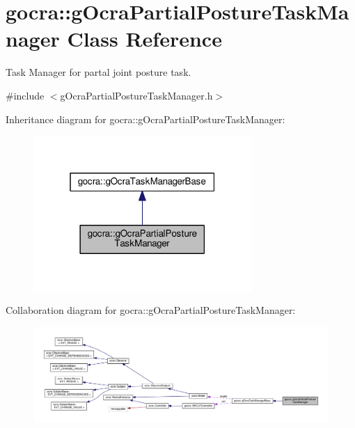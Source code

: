 \hypertarget{classgocra_1_1gOcraPartialPostureTaskManager}{}\section{gocra\+:\+:g\+Ocra\+Partial\+Posture\+Task\+Manager Class Reference}
\label{classgocra_1_1gOcraPartialPostureTaskManager}


Task Manager for partal joint posture task.  




{\ttfamily \#include $<$g\+Ocra\+Partial\+Posture\+Task\+Manager.\+h$>$}



Inheritance diagram for gocra\+:\+:g\+Ocra\+Partial\+Posture\+Task\+Manager\+:
\nopagebreak
\begin{figure}[H]
\begin{center}
\leavevmode
\includegraphics[width=235pt]{d1/d79/classgocra_1_1gOcraPartialPostureTaskManager__inherit__graph}
\end{center}
\end{figure}


Collaboration diagram for gocra\+:\+:g\+Ocra\+Partial\+Posture\+Task\+Manager\+:
\nopagebreak
\begin{figure}[H]
\begin{center}
\leavevmode
\includegraphics[width=350pt]{de/d94/classgocra_1_1gOcraPartialPostureTaskManager__coll__graph}
\end{center}
\end{figure}
